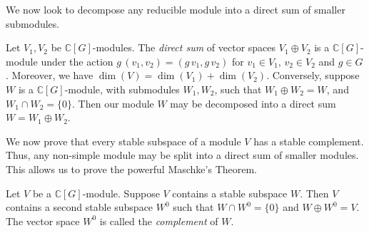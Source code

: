 \documentclass[11pt]{report}
\begin{document}
We now look to decompose any reducible module into a direct sum of smaller submodules.




\begin{defn}
	Let $V_{1},V_{2}$ be $\mathbb{C}[G]$-modules. The \emph{direct sum} of vector spaces $V_{1}\oplus V_{2}$ is a $\mathbb{C}[G]$-module under the action $g \,(v_{1},v_{2}) = 
	(g\, v_{1},g \, v_{2})$ for $v_{1}\in V_{1}, \, v_{2} \in V_{2}$ and $g\in G$. Moreover, we have $\dim(V) = \dim(V_{1}) + \dim(V_{2})$.	Conversely, suppose $W$ is a $\mathbb{C}[G]$-module, with submodules $W_{1},W_{2}$, such that $ W_{1} \oplus W_{2} = W$, and $W_{1} \cap W_{2} = \{0\}$. Then our module $W$ may be decomposed into a direct sum $W = W_{1} \oplus W_{2}$. 
\end{defn}




We now prove that every stable subspace of a module $V$ has a stable complement.
Thus, any non-simple module may be split into a direct sum of smaller modules. This allows us to prove the powerful Maschke's Theorem.



\begin{lemma} 
	\label{chpt3:lem:spacedecomp}
	Let $V$ be a $\mathbb{C}[G]$-module. Suppose $V$ contains a stable 
	subspace $W$. Then $V$ contains a second stable subspace $W^{0}$ such that 
	$W \cap W^{0} = \{0\}$ and $W \oplus W^{0} = V$. The vector space $W^{0}$ 
	is called the \emph{complement} of $W$.
\end{lemma}
\end{document}

